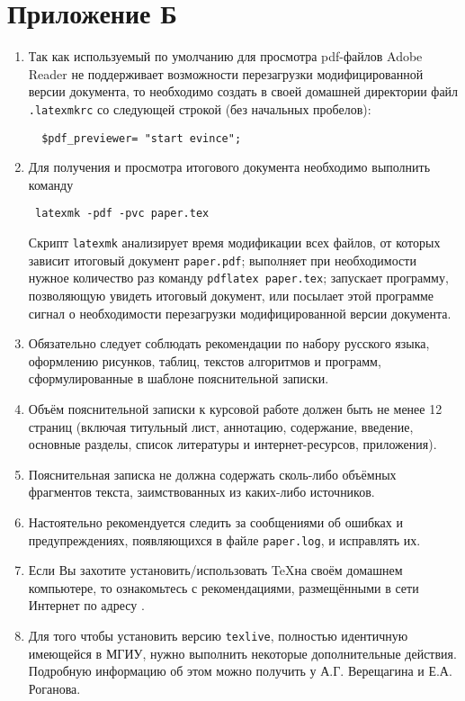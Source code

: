 \section{Приложение Б}

\begin{enumerate}

\item
Так как используемый по умолчанию для просмотра pdf-файлов Adobe Reader не 
поддерживает возможности перезагрузки модифицированной версии документа, то
необходимо создать в своей домашней директории файл \verb|.latexmkrc|
со следующей строкой (без начальных пробелов):

\begin{verbatim}
  $pdf_previewer= "start evince";
\end{verbatim} 

\item
Для получения и просмотра итогового документа необходимо выполнить команду

\begin{verbatim}
 latexmk -pdf -pvc paper.tex
\end{verbatim} 

\noindent
Скрипт \verb|latexmk| анализирует время модификации всех файлов, от которых
зависит итоговый документ \verb|paper.pdf|; выполняет при необходимости
нужное количество раз команду \verb|pdflatex paper.tex|; запускает программу,
позволяющую увидеть итоговый документ, или посылает этой программе
сигнал о необходимости перезагрузки модифицированной версии документа. 

\item
Обязательно следует соблюдать рекомендации по набору русского языка, 
оформлению рисунков, таблиц, текстов алгоритмов и программ, сформулированные
в шаблоне пояснительной записки.

\item
Объём пояснительной записки к курсовой работе должен быть не менее
12 страниц (включая титульный лист, аннотацию, содержание, введение,
основные разделы, список литературы и интернет-ресурсов, приложения).

\item
Пояснительная записка не должна содержать сколь-либо объёмных фрагментов
текста, заимствованных из каких-либо источников. 

\item
Настоятельно рекомендуется следить за сообщениями об ошибках и 
предупреждениях, появляющихся в файле \verb|paper.log|, и исправлять их.

\item
Если Вы захотите установить/использовать \TeX на своём домашнем компьютере,
то ознакомьтесь с рекомендациями, размещёнными в сети Интернет по адресу
.

\item
Для того чтобы установить версию \verb|texlive|, полностью идентичную 
имеющейся в МГИУ, нужно выполнить некоторые дополнительные действия. Подробную 
информацию об этом можно получить у А.Г. Верещагина и Е.А. Роганова.

\end{enumerate}
